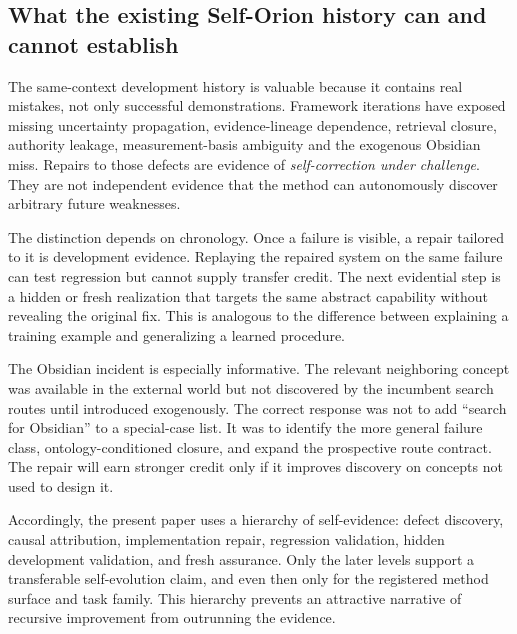 \subsection{What the existing Self-Orion history can and cannot establish}

The same-context development history is valuable because it contains real mistakes, not only successful demonstrations. Framework iterations have exposed missing uncertainty propagation, evidence-lineage dependence, retrieval closure, authority leakage, measurement-basis ambiguity and the exogenous Obsidian miss. Repairs to those defects are evidence of \emph{self-correction under challenge}. They are not independent evidence that the method can autonomously discover arbitrary future weaknesses.

The distinction depends on chronology. Once a failure is visible, a repair tailored to it is development evidence. Replaying the repaired system on the same failure can test regression but cannot supply transfer credit. The next evidential step is a hidden or fresh realization that targets the same abstract capability without revealing the original fix. This is analogous to the difference between explaining a training example and generalizing a learned procedure.

The Obsidian incident is especially informative. The relevant neighboring concept was available in the external world but not discovered by the incumbent search routes until introduced exogenously. The correct response was not to add ``search for Obsidian'' to a special-case list. It was to identify the more general failure class, ontology-conditioned closure, and expand the prospective route contract. The repair will earn stronger credit only if it improves discovery on concepts not used to design it.

Accordingly, the present paper uses a hierarchy of self-evidence: defect discovery, causal attribution, implementation repair, regression validation, hidden development validation, and fresh assurance. Only the later levels support a transferable self-evolution claim, and even then only for the registered method surface and task family. This hierarchy prevents an attractive narrative of recursive improvement from outrunning the evidence.
